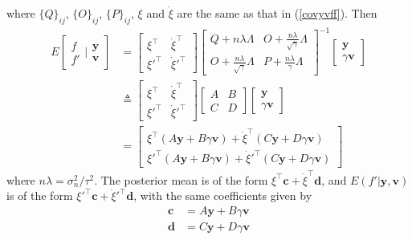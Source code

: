 where $\{Q\}_{ij}$, $\{O\}_{ij}$, $\{P\}_{ij}$, $\xi$ and $\dot{\xi}$ are the same as that in (\ref{covyvff}). Then
\begin{equation}
\begin{split}
E\left[ \begin{matrix}
f \\
f'
\end{matrix} | \begin{matrix}
\mathbf{y} \\
\mathbf{v}
\end{matrix}\right] &= 
\left[ \begin{matrix}
\xi^\top& \dot{\xi}^\top \\
\xi'^\top & \dot{\xi}'^\top 
\end{matrix} \right] 
\left[ \begin{matrix}
Q+n\lambda \Lambda & O+\frac{n\lambda}{\sqrt{\gamma}} \Lambda\\
 O+\frac{n\lambda}{\sqrt{\gamma}} \Lambda &  P+\frac{n\lambda}{\gamma} \Lambda
\end{matrix} \right]^{-1}
\left[ 
\begin{matrix}
\mathbf{y} \\
\gamma \mathbf{v}
\end{matrix} \right] \\
&\triangleq
\left[ \begin{matrix}
\xi^\top& \dot{\xi}^\top \\
\xi'^\top & \dot{\xi}'^\top 
\end{matrix} \right] 
\left[ \begin{matrix}
A & B\\
C & D
\end{matrix} \right]
\left[ 
\begin{matrix}
\mathbf{y} \\
\gamma \mathbf{v}
\end{matrix} \right] \\
&=
\left[ \begin{matrix}
\xi^\top(A\mathbf{y}+B\gamma \mathbf{v})+ \dot{\xi}^\top(C\mathbf{y}+D\gamma \mathbf{v}) \\
\xi'^\top(A\mathbf{y}+B\gamma \mathbf{v})+ \dot{\xi}'^\top(C\mathbf{y}+D\gamma \mathbf{v}) 
\end{matrix} \right] 
\end{split}
\end{equation}
where $n\lambda = \sigma_n^2 / \tau^2$. The posterior mean is of the form $\xi^\top \mathbf{c}+\dot{\xi}^\top\mathbf{d}$, and $E(f' | \mathbf{y},\mathbf{v})$ is of the form $\xi'^\top \mathbf{c}+\dot{\xi}'^\top\mathbf{d}$, with the same coefficients given by
\begin{align}
\mathbf{c}&=A\mathbf{y}+B\gamma \mathbf{v}\\
\mathbf{d}&=C\mathbf{y}+D\gamma \mathbf{v} 
\end{align}


